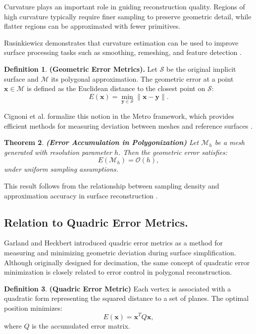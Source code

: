 \documentclass[12pt, a4paper, oneside]{book}
\theoremstyle{plain}
\newtheorem{theorem}{Theorem}[chapter]
\theoremstyle{definition}
\newtheorem{definition}[theorem]{Definition}
\theoremstyle{remark}
\theoremstyle{definition}
\begin{document}
Curvature plays an important role in guiding reconstruction quality. Regions of high curvature typically require finer sampling to preserve geometric detail, while flatter regions can be approximated with fewer primitives.

Rusinkiewicz demonstrates that curvature estimation can be used to improve surface processing tasks such as smoothing, remeshing, and feature detection \cite{rusinkiewicz2004estimating}.

\vspace{0.5em}

\begin{definition}
    \textbf{ (Geometric Error Metrics).}
Let $\mathcal{S}$ be the original implicit surface and $\mathcal{M}$ its polygonal approximation. The geometric error at a point $\mathbf{x} \in \mathcal{M}$ is defined as the Euclidean distance to the closest point on $\mathcal{S}$:
\[
E(\mathbf{x}) = \min_{\mathbf{y} \in \mathcal{S}} \|\mathbf{x} - \mathbf{y}\|.
\]
\end{definition}

Cignoni et al. formalize this notion in the Metro framework, which provides efficient methods for measuring deviation between meshes and reference surfaces \cite{cignoni1998metro}.

\vspace{0.5em}

\begin{theorem}
    \textbf{(Error Accumulation in Polygonization)}
Let $\mathcal{M}_h$ be a mesh generated with resolution parameter $h$. Then the geometric error satisfies:
\[
E(\mathcal{M}_h) = \mathcal{O}(h),
\]
under uniform sampling assumptions.
\end{theorem}



This result follows from the relationship between sampling density and approximation accuracy in surface reconstruction \cite{cignoni1998metro}.

\vspace{0.5em}

\subsection{Relation to Quadric Error Metrics.}

Garland and Heckbert introduced quadric error metrics as a method for measuring and minimizing geometric deviation during surface simplification. Although originally designed for decimation, the same concept of quadratic error minimization is closely related to error control in polygonal reconstruction.
\begin{definition}
    \textbf{(Quadric Error Metric)}
Each vertex is associated with a quadratic form representing the squared distance to a set of planes. The optimal position minimizes:
\[
E(\mathbf{x}) = \mathbf{x}^T Q \mathbf{x},
\]
where $Q$ is the accumulated error matrix.
\end{definition}
\end{document}
